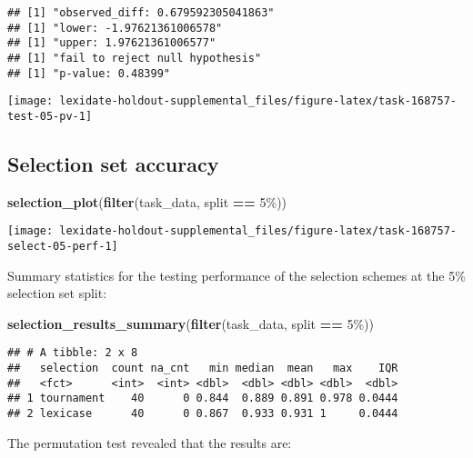 \documentclass[
]{book}
\newenvironment{Shaded}{\begin{snugshade}}{\end{snugshade}}
\newcommand{\FunctionTok}[1]{\textcolor[rgb]{0.13,0.29,0.53}{\textbf{#1}}}
\newcommand{\NormalTok}[1]{#1}
\newcommand{\SpecialCharTok}[1]{\textcolor[rgb]{0.81,0.36,0.00}{\textbf{#1}}}
\newcommand{\StringTok}[1]{\textcolor[rgb]{0.31,0.60,0.02}{#1}}
\begin{document}
\begin{verbatim}
## [1] "observed_diff: 0.679592305041863"
## [1] "lower: -1.97621361006578"
## [1] "upper: 1.97621361006577"
## [1] "fail to reject null hypothesis"
## [1] "p-value: 0.48399"
\end{verbatim}

\texttt{[image: lexidate-holdout-supplemental\_files/figure-latex/task-168757-test-05-pv-1]}

\hypertarget{selection-set-accuracy-20}{%
\subsection{Selection set accuracy}\label{selection-set-accuracy-20}}

\begin{Shaded}
\begin{Highlighting}[]
\FunctionTok{selection\_plot}\NormalTok{(}\FunctionTok{filter}\NormalTok{(task\_data, split }\SpecialCharTok{==} \StringTok{\textquotesingle{}5\%\textquotesingle{}}\NormalTok{))}
\end{Highlighting}
\end{Shaded}

\texttt{[image: lexidate-holdout-supplemental\_files/figure-latex/task-168757-select-05-perf-1]}

Summary statistics for the testing performance of the selection schemes at the 5\% selection set split:

\begin{Shaded}
\begin{Highlighting}[]
\FunctionTok{selection\_results\_summary}\NormalTok{(}\FunctionTok{filter}\NormalTok{(task\_data, split }\SpecialCharTok{==} \StringTok{\textquotesingle{}5\%\textquotesingle{}}\NormalTok{))}
\end{Highlighting}
\end{Shaded}

\begin{verbatim}
## # A tibble: 2 x 8
##   selection  count na_cnt   min median  mean   max    IQR
##   <fct>      <int>  <int> <dbl>  <dbl> <dbl> <dbl>  <dbl>
## 1 tournament    40      0 0.844  0.889 0.891 0.978 0.0444
## 2 lexicase      40      0 0.867  0.933 0.931 1     0.0444
\end{verbatim}

The permutation test revealed that the results are:
\end{document}
